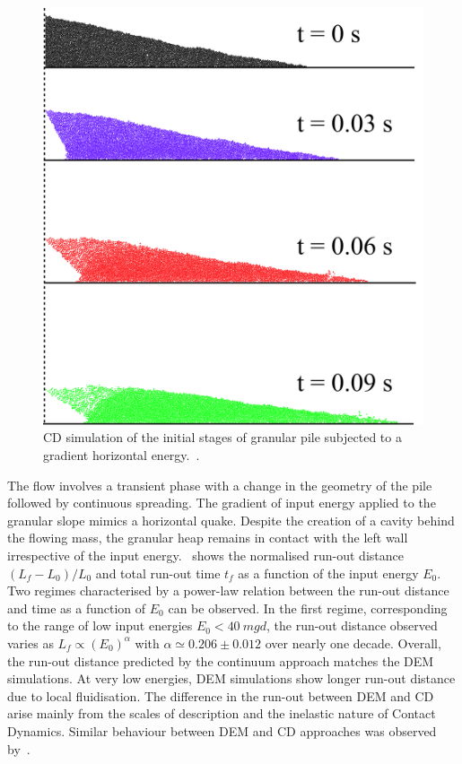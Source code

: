 \documentclass[3p,times,procedia,number]{elsarticle}
\begin{document}
\begin{figure}
  \centering
  \includegraphics[width=\textwidth]{figs/Gradient_Slope_CD_200J}
  \caption{CD simulation of the initial stages of granular pile subjected to a 
  gradient horizontal energy.~\citep{Mutabaruka2013}.}
  \label{fig:Gradient_Slope_CD_200J}
\end{figure}

The flow involves a transient phase with a change in the geometry of the pile 
followed by continuous spreading. The gradient of input energy applied to the 
granular slope mimics a horizontal quake. Despite the creation 
of a cavity behind the flowing mass, the granular heap remains in 
contact with the left wall irrespective of the input 
energy.~ shows the normalised run-out distance 
$(L_f - L_0)/L_0$ and total run-out time $t_f$ as a function of the input 
energy $E_0$. Two regimes characterised by a power-law relation between 
the run-out distance and time as a function of $E_0$ can be observed. In the 
first regime, corresponding to the range of low input energies $E_0 < 40 \ 
mgd$, the run-out distance observed varies as $L_f \propto (E_0)^\alpha$ with 
$\alpha 
\simeq 0.206 \pm 0.012$ over nearly one decade. Overall, the run-out distance 
predicted by the continuum approach matches the DEM simulations. At very low 
energies, DEM simulations show longer run-out distance due to local 
fluidisation. The difference in the run-out between DEM and CD arise mainly 
from the scales of description and the inelastic nature of Contact Dynamics. 
Similar behaviour between DEM and CD approaches was observed 
by~\citet{Radjai1997}. 
\end{document}
